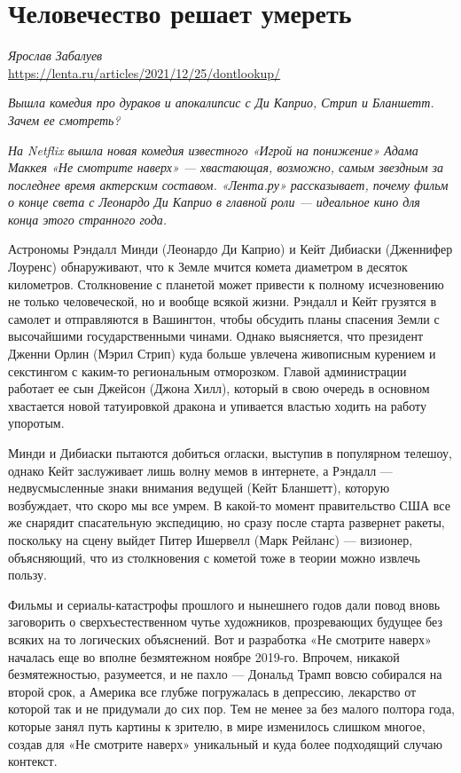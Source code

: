 \section{Человечество решает умереть}
\textit{Ярослав Забалуев}\\
\url{https://lenta.ru/articles/2021/12/25/dontlookup/}

{\it Вышла комедия про дураков и апокалипсис с Ди Каприо, Стрип и Бланшетт. Зачем ее смотреть?}

\textit{На Netflix вышла новая комедия известного «Игрой на понижение» Адама Маккея «Не смотрите наверх» --- хвастающая, возможно, самым звездным за последнее время актерским составом. «Лента.ру» рассказывает, почему фильм о конце света с Леонардо Ди Каприо в главной роли --- идеальное кино для конца этого странного года.}

Астрономы Рэндалл Минди (Леонардо Ди Каприо) и Кейт Дибиаски (Дженнифер Лоуренс) обнаруживают, что к Земле мчится комета диаметром в десяток километров. Столкновение с планетой может привести к полному исчезновению не только человеческой, но и вообще всякой жизни. Рэндалл и Кейт грузятся в самолет и отправляются в Вашингтон, чтобы обсудить планы спасения Земли с высочайшими государственными чинами. Однако выясняется, что президент Дженни Орлин (Мэрил Стрип) куда больше увлечена живописным курением и секстингом с каким-то региональным отморозком. Главой администрации работает ее сын Джейсон (Джона Хилл), который в свою очередь в основном хвастается новой татуировкой дракона и упивается властью ходить на работу упоротым.

Минди и Дибиаски пытаются добиться огласки, выступив в популярном телешоу, однако Кейт заслуживает лишь волну мемов в интернете, а Рэндалл --- недвусмысленные знаки внимания ведущей (Кейт Бланшетт), которую возбуждает, что скоро мы все умрем. В какой-то момент правительство США все же снарядит спасательную экспедицию, но сразу после старта развернет ракеты, поскольку на сцену выйдет Питер Ишервелл (Марк Рейланс) --- визионер, объясняющий, что из столкновения с кометой тоже в теории можно извлечь пользу.

Фильмы и сериалы-катастрофы прошлого и нынешнего годов дали повод вновь заговорить о сверхъестественном чутье художников, прозревающих будущее без всяких на то логических объяснений. Вот и разработка «Не смотрите наверх» началась еще во вполне безмятежном ноябре 2019-го. Впрочем, никакой безмятежностью, разумеется, и не пахло --- Дональд Трамп вовсю собирался на второй срок, а Америка все глубже погружалась в депрессию, лекарство от которой так и не придумали до сих пор. Тем не менее за без малого полтора года, которые занял путь картины к зрителю, в мире изменилось слишком многое, создав для «Не смотрите наверх» уникальный и куда более подходящий случаю контекст.

